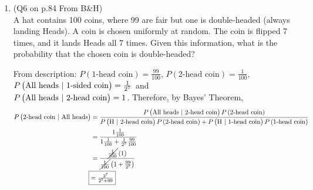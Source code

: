 \documentclass[11pt]{article}
\begin{document}
\begin{enumerate}
	\item (Q6 on p.84 From B\&H)\\
	A hat contains 100 coins, where 99 are fair but one is double-headed (always landing Heads). A coin is chosen uniformly at random. The coin is flipped 7 times, and it lands Heads all 7 times. Given this information, what is the probability that the chosen coin is double-headed?
		\begin{mdframed}
			From description: $ P\left( \text{1-head coin} \right) = \frac{99}{100}$, $ P\left( \text{2-head coin} \right) = \frac{1}{100} $, $ P\left( \text{All heads $ | $ 1-sided coin} \right) = \frac{1}{2^7}$ and \\
			$ P\left( \text{All heads $ | $ 2-head coin} \right) = 1$. Therefore, by Bayes' Theorem,
			\begin{align*}
				P\left( \text{2-head coin $ | $ All heads} \right) &= \frac{P\left( \text{All heads $ | $ 2-head coin} \right) P\left( \text{2-head coin} \right)}{P\left( \text{H $ | $ 2-head coin} \right) P\left( \text{2-head coin} \right) + P\left( \text{H $ | $ 1-head coin} \right)P\left( \text{1-head coin} \right)}\\
				&= \frac{1 \frac{1}{100}}{1 \frac{1}{100} + \frac{1}{2^7}\frac{99}{100}}\\
				&= \frac{\cancel{\frac{1}{100}}\left( 1 \right)}{\cancel{\frac{1}{100}}\left( 1 + \frac{99}{2^7} \right)}\\
				\Aboxed{&= \tfrac{2^7}{2^7 + 99}}
			\end{align*}
		\end{mdframed}
\end{enumerate}
\end{document}
